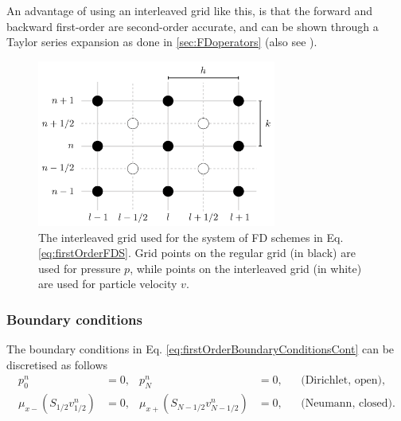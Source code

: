 {An advantage of using an interleaved grid like this, is that the forward and backward first-order are second-order accurate, and can be shown through a Taylor series expansion as done in \ref{sec:FDoperators} (also see \cite{Harrison2018}).

\begin{figure}
    \centering
    \includegraphics[width=0.7\textwidth]{figures/resonators/brass/interleavedGridFigure.pdf}
    \caption{The interleaved grid used for the system of FD schemes in Eq. \eqref{eq:firstOrderFDS}. Grid points on the regular grid (in black) are used for pressure $p$, while points on the interleaved grid (in white) are used for particle velocity $v$.\label{fig:interleavedGrid}}
\end{figure}

\subsubsection{Boundary conditions}\label{sec:boundariesFirstOrder}
The boundary conditions in Eq. \eqref{eq:firstOrderBoundaryConditionsCont} can be discretised as follows
\begin{subequations}
    \begin{align}\label{eq:firstOrderBoundaryConditions}
        p_0^n &= 0, & p_N^n &= 0, & &\text{(Dirichlet, open),}\\
        \mu_{x-}(S_{1/2}v_{1/2}^n) &= 0, & \mu_{x+}(S_{N-1/2}v_{N-1/2}^n) &= 0, & &\text{(Neumann, closed)}.
    \end{align}
\end{subequations}

}
